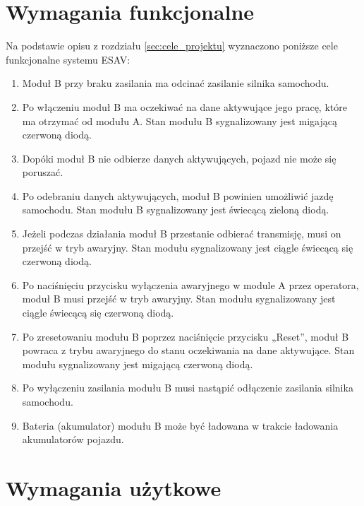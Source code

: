 
\section{Wymagania funkcjonalne}
\label{sec:wymagania_funkcjonalne}

Na podstawie opisu z rozdziału \ref{sec:cele_projektu} wyznaczono poniższe cele funkcjonalne systemu ESAV:

\begin{enumerate}[label=1.2.\arabic*:]
\item Moduł B przy braku zasilania ma odcinać zasilanie silnika samochodu.
\item Po włączeniu moduł B ma oczekiwać na dane aktywujące jego pracę, które ma otrzymać od modułu A. Stan modułu B sygnalizowany jest migającą czerwoną diodą.
\item Dopóki moduł B nie odbierze danych aktywujących, pojazd nie może się poruszać.
\item Po odebraniu danych aktywujących, moduł B powinien umożliwić jazdę samochodu. Stan modułu B sygnalizowany jest świecącą zieloną diodą.
\item Jeżeli podczas działania moduł B przestanie odbierać transmisję, musi on przejść w tryb awaryjny. Stan modułu sygnalizowany jest ciągle świecącą się czerwoną diodą.
\item Po naciśnięciu przycisku wyłączenia awaryjnego w module A przez operatora, moduł B musi przejść w tryb awaryjny. Stan modułu sygnalizowany jest ciągle świecącą się czerwoną diodą.
\item Po zresetowaniu modułu B poprzez naciśnięcie przycisku „Reset”, moduł B powraca z trybu awaryjnego do stanu oczekiwania na dane aktywujące. Stan modułu sygnalizowany jest migającą czerwoną diodą.
\item Po wyłączeniu zasilania modułu B musi nastąpić odłączenie zasilania silnika samochodu.
\item Bateria (akumulator) modułu B może być ładowana w trakcie ładowania akumulatorów pojazdu.
\end{enumerate}


\section{Wymagania użytkowe}
\label{sec:wymagania_wydajnosciowe}

